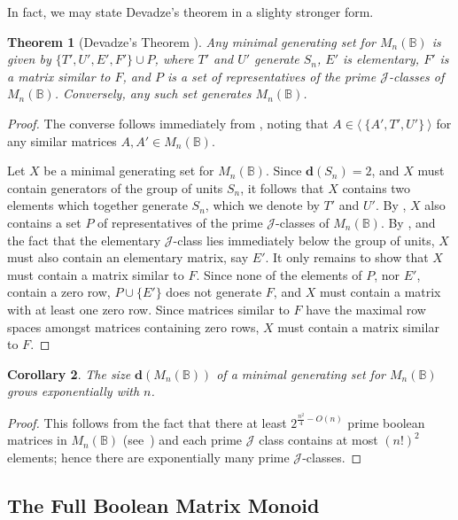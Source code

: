 \documentclass[11pt]{article}
\newtheorem{thm}{Theorem}[section]
\newtheorem{cor}[thm]{Corollary}
\numberwithin{equation}{section}
\newcommand{\genset}[1]{\ensuremath{\langle\: #1 \:\rangle}}
\newcommand{\B}{\mathbb{B}}
\newcommand{\Bn}{M_n(\B)}
\newcommand{\J}{\mathscr{J}}
\begin{document}
In fact, we may state Devadze's theorem in a slighty stronger form.
\begin{thm}[Devadze's Theorem \cite{Konieczny2011aa}]
  Any minimal generating set for $\Bn$ is given by $\{T', U', E', F'\} \cup P$,
  where $T'$ and $U'$ generate $S_n$, $E'$ is elementary, $F'$ is a matrix
  similar to $F$, and $P$ is a set of representatives of the prime $\J$-classes
  of $\Bn$. Conversely, any such set generates $\Bn$.
\end{thm}
\begin{proof}
  The converse follows immediately from , noting that $A
  \in \genset{\{A', T', U'\}}$ for any similar matrices $A, A' \in \Bn$.

  Let $X$ be a minimal generating set for $\Bn$. Since $\mathbf{d}(S_n) = 2$,
  and $X$ must contain generators of the group of units $S_n$, it follows that
  $X$ contains two elements which together generate $S_n$, which we denote by
  $T'$ and $U'$. By \cite[Lemma 4.2]{Konieczny2011aa}, $X$ also contains a set
  $P$ of representatives of the prime $\J$-classes of $\Bn$. By \cite[Lemma
  4.5]{Konieczny2011aa}, and the fact that the elementary $\J$-class lies
  immediately below the group of units, $X$ must also contain an elementary
  matrix, say $E'$. It only remains to show that $X$ must contain a matrix
  similar to $F$. Since none of the elements of $P$, nor $E'$, contain a
  zero row, $P \cup \{E'\}$ does not generate $F$, and $X$ must contain a matrix
  with at least one zero row. Since matrices similar to $F$ have the maximal row
  spaces amongst matrices containing zero rows, $X$ must contain a matrix
  similar to $F$.
\end{proof}

\begin{cor}
  The size $\mathbf{d}(\Bn)$ of a minimal generating set for $\Bn$ grows
  exponentially with $n$.
\end{cor}
\begin{proof}
  This follows from the fact that there at least $2^{\frac{n^2}{4} - O(n)}$
  prime boolean matrices in $\Bn$ (see~\cite[Theorem 2.4.1]{Kim1982aa}) and each
  prime $\J$ class contains at most $(n!)^2$ elements; hence there are
  exponentially many prime $\J$-classes.
\end{proof}

\subsection{The Full Boolean Matrix Monoid}
\end{document}
